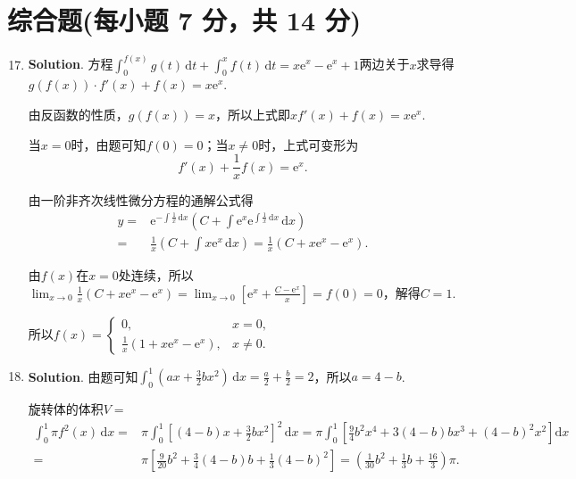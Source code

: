 \documentclass[../Main.tex]{subfiles}
\begin{document}
\section{综合题(每小题 7 分，共 14 分)}
\begin{enumerate}
    \setcounter{enumi}{16}
    \item \textbf{Solution}. 方程$\int_{0}^{f(x)}g(t)\,\mathrm{d}t+\int_{0}^{x}
              f(t)\,\mathrm{d}t=x\mathrm{e}^{x}-\mathrm{e}^{x}+1$两边关于$x$求导得$g(f(x))\cdot
              f'(x)+f(x)=x\mathrm{e}^{x}$.

          由反函数的性质，$g(f(x))=x$，所以上式即$xf'(x)+f(x)=x\mathrm{e}^{x}$.

          当$x=0$时，由题可知$f(0)=0$；当$x\neq0$时，上式可变形为
          \[
              f'(x)+\frac{1}{x}f(x)=\mathrm{e}^{x}.
          \]

          由一阶非齐次线性微分方程的通解公式得
          \[
              \begin{aligned}
                  y = & \mathrm{e}^{-\int\frac{1}{x}\,\mathrm{d}x}\left(C+\int\mathrm{e}^{x}\mathrm{e}^{\int\frac{1}{x}\,\mathrm{d}x}\,\mathrm{d}x\right) \\
                  =   & \frac{1}{x}\left(C+\int x\mathrm{e}^{x}\,\mathrm{d}x\right) = \frac{1}{x}\left(C+x\mathrm{e}^{x}-\mathrm{e}^{x}\right).
              \end{aligned}
          \]

          由$f(x)$在$x=0$处连续，所以$\lim_{x\to0}\frac{1}{x}\left(C+x\mathrm{e}^{x}-
              \mathrm{e}^{x}\right)=\lim_{x\to0}\left[\mathrm{e}^{x}+\frac{C-\mathrm{e}^{x}}{x}
                  \right]=f(0)=0$，解得$C=1$.

          所以$f(x)=
              \begin{cases}
                  0,                                                        & x=0,    \\
                  \frac{1}{x}\left(1+x\mathrm{e}^{x}-\mathrm{e}^{x}\right), & x\neq0.
              \end{cases}$

    \item \textbf{Solution}. 由题可知$\int_{0}^{1}\left(ax+\frac{3}{2}bx^{2}
              \right)\,\mathrm{d}x=\frac{a}{2}+\frac{b}{2}=2$，所以$a=4-b$.

          旋转体的体积$V=$
          \[
              \begin{aligned}
                  \int_{0}^{1}\pi f^{2}(x)\,\mathrm{d}x = & \pi\int_{0}^{1}\left[(4-b)x+\frac{3}{2}bx^{2}\right]^{2}\,\mathrm{d}x=\pi\int_{0}^{1}\left[\frac{9}{4}b^{2}x^{4}+3(4-b)bx^{3}+(4-b)^{2} x^{2}\right]\mathrm{d}x \\
                  =                                       & \pi\left[\frac{9}{20}b^{2}+\frac{3}{4}(4-b)b+\frac{1}{3}(4-b)^{2}\right] = \left(\frac{1}{30}b^{2}+\frac{1}{3}b+\frac{16}{3}\right)\pi.
              \end{aligned}
          \]


\end{enumerate}
\end{document}
